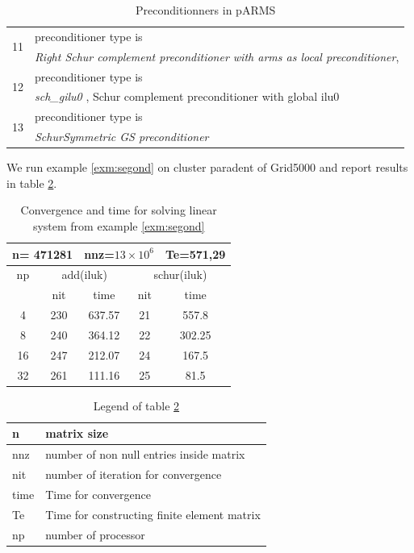 \documentclass[a4paper,twoside,12pt]{book}
\begin{document}
\begin{table}[hbtp]
\begin{tabular}{|l|l|}
\multirow{2}{*}{11} &  preconditioner type is \\ & \textit{Right Schur
complement preconditioner with arms as local preconditioner},\\ \hline
\multirow{2}{*}{12} &  preconditioner type is \\ &     \textit{ sch\_gilu0 },
Schur complement preconditioner with global ilu0\\ \hline
\multirow{2}{*}{13} &  preconditioner type is \\ &     \textit{Schur\-Symmetric
GS preconditioner} \\ \hline
\end{tabular}
\caption{Preconditionners in pARMS}
\label{precond}
\end{table}

We run example \ref{exm:segond} on cluster paradent of Grid5000 and report
results in table \ref{parmResult}.

\begin{table}
\begin{center}
\begin{tabular}{|c|c|c|c|c|}
\hline
\multicolumn{2}{|c||}{\textbf{n= 471281}} &
\multicolumn{2}{|c||}{\textbf{nnz=$13\times10^6$}} &
\multicolumn{1}{|c|}{\textbf{Te=571,29}}\\ \hline
\multirow{1}{*}{np} & \multicolumn{2}{|c|}{add(iluk)} &
\multicolumn{2}{|c|}{schur(iluk)}
\\ \cline{2-5}
&
nit & time & nit & time \\ \hline
4 & 230 & 637.57 &21 & 557.8 \\ \hline
8 & 240 & 364.12 &  22 & 302.25 \\ \hline
16 & 247 &  212.07 &  24 & 167.5  \\ \hline
32 & 261 & 111.16 & 25 & 81.5 \\ \hline
\end{tabular}
\end{center}
\caption{Convergence and time for solving linear system from example
\ref{exm:segond} }
\label{parmResult}
\end{table}

\begin{table}
\begin{center}

\begin{tabular}{|l|l|}
\hline
n & matrix size \\ \hline
nnz & number of non null entries inside matrix \\ \hline
nit & number of iteration for convergence \\ \hline
time & Time for convergence \\ \hline
Te & Time for constructing finite element matrix \\ \hline
np & number of processor \\ \hline
\end{tabular}
\caption{Legend of table \ref{parmResult} }
\label{legtableparm}
\end{center}
\end{table}
\end{document}
